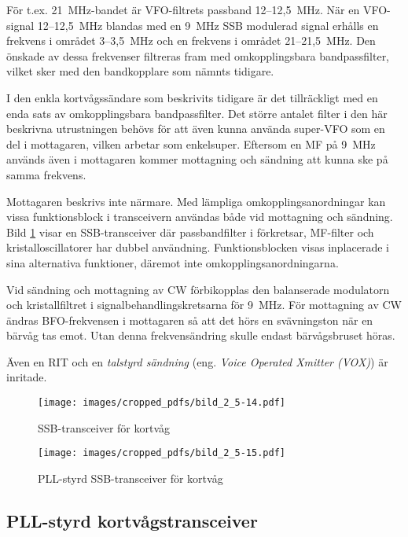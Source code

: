 För t.ex. 21~MHz-bandet är VFO-filtrets passband 12--12,5~MHz.
När en VFO-signal 12--12,5~MHz blandas med en 9~MHz SSB modulerad signal
erhålls en frekvens i området 3--3,5~MHz och en frekvens i området 21--21,5~MHz.
Den önskade av dessa frekvenser filtreras fram med omkopplingsbara
bandpassfilter, vilket sker med den bandkopplare som nämnts tidigare.

I den enkla kortvågssändare som beskrivits tidigare är det
tillräckligt med en enda sats av omkopplingsbara bandpassfilter.
Det större antalet filter i den här beskrivna utrustningen behövs för att
även kunna använda super-VFO som en del i mottagaren, vilken arbetar
som enkelsuper.
Eftersom en MF på 9~MHz används även i mottagaren kommer mottagning och
sändning att kunna ske på samma frekvens.

Mottagaren beskrivs inte närmare.
Med lämpliga omkopplingsanordningar kan vissa funktionsblock i
transceivern användas både vid mottagning och sändning.
Bild \ref{fig:bildII5-14} visar en SSB-transceiver där passbandfilter i
förkretsar, MF-filter och kristalloscillatorer har dubbel användning.
Funktionsblocken visas inplacerade i sina alternativa
funktioner, däremot inte omkopplingsanordningarna.

Vid sändning och mottagning av CW förbikopplas den balanserade
modulatorn och kristallfiltret i signalbehandlingskretsarna för 9~MHz.
För mottagning av CW ändras BFO-frekvensen i mottagaren så att
det hörs en svävningston när en bärvåg tas emot.
Utan denna frekvensändring skulle endast bärvågsbruset höras.

Även en RIT och en \emph{talstyrd sändning} (eng.
\emph{Voice Operated Xmitter (VOX)}) är inritade.

\begin{figure}
  \texttt{[image: images/cropped\_pdfs/bild\_2\_5-14.pdf]}
  \caption{SSB-transceiver för kortvåg}
  \label{fig:bildII5-14}
\end{figure}

\begin{figure}
  \texttt{[image: images/cropped\_pdfs/bild\_2\_5-15.pdf]}
  \caption{PLL-styrd SSB-transceiver för kortvåg}
  \label{fig:bildII5-15}
\end{figure}

\subsection{PLL-styrd kortvågstransceiver}

